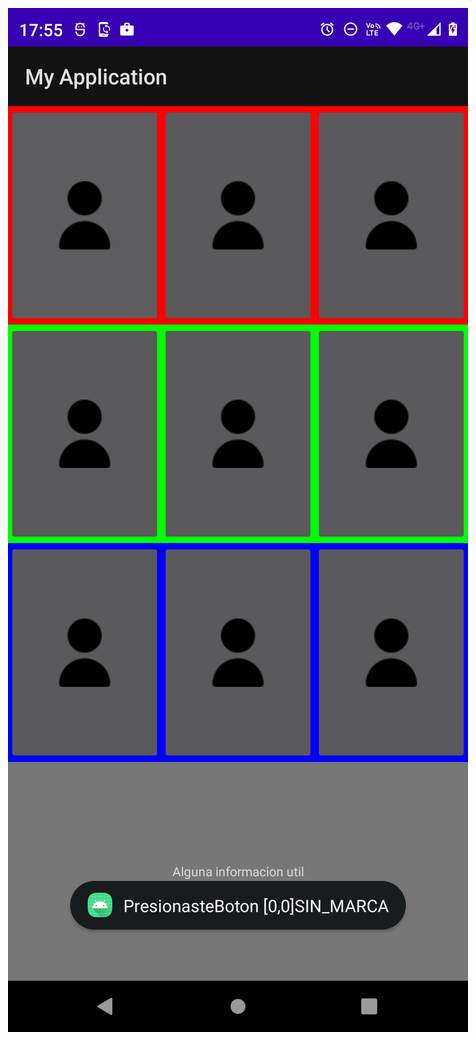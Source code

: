 \begin{frame}[fragile]
\begin{columns}
\begin{center}
\includegraphics[width=0.95\linewidth]{00_ComportamientoAplicacionTicTacToe//Etapa2_Fase1.png}    
\end{center}
\end{columns}
\end{frame}








